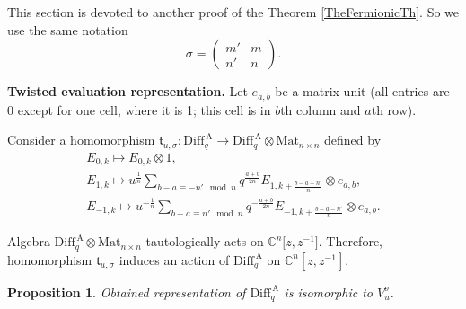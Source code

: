 \documentclass[pdftex]{sigma}
\numberwithin{equation}{section}
\newtheorem{Proposition}[Theorem]{Proposition}
\theoremstyle{definition}
\newcommand{\qaD}{\mathrm{Diff}_q^{\, \mathrm{A}}}
\begin{document}
This section is devoted to another proof of the Theorem \ref{TheFermionicTh}. So we use the same notation
\[ \sigma = \begin{pmatrix}
m' & m \\
n' & n
\end{pmatrix}.\]

{\bf Twisted evaluation representation.} Let $e_{a,b}$ be a matrix unit (all entries are 0 except for one cell, where it is 1; this cell is in $b$th column and $a$th row).

Consider a homomorphism $\mathfrak{t}_{u, \sigma}\colon \qaD \rightarrow \qaD \otimes \mathrm{Mat}_{n \times n}$ defined by
\begin{gather}
E_{0,k} \mapsto E_{0, k} \otimes 1,\nonumber \\
E_{1,k} \mapsto u^{\frac{1}{n}} \sum_{b-a \equiv - n' \! \mod n} q^{\frac{a+b}{2n}} E_{1, k+ \frac{b-a+n'}{n}} \otimes e_{a,b}, \label{def:Etwev} \\
E_{-1,k} \mapsto u^{-\frac{1}{n}} \sum_{b-a \equiv n' \! \mod n} q^{-\frac{a+b}{2n}} E_{-1, k+ \frac{b-a-n'}{n}} \otimes e_{a,b}.\nonumber
\end{gather}

Algebra $\qaD \otimes \mathrm{Mat}_{n \times n}$ tautologically acts on $\mathbb{C}^n \big[z,z^{-1}\big]$. Therefore, homomorphism $\mathfrak{t}_{u, \sigma}$ induces an action of $\qaD$ on $\mathbb{C}^n [z,z^{-1}]$.

\begin{Proposition} \label{proposition:twev}
Obtained representation of $\qaD$ is isomorphic to $V_u^{\sigma}$.
\end{Proposition}
\end{document}
